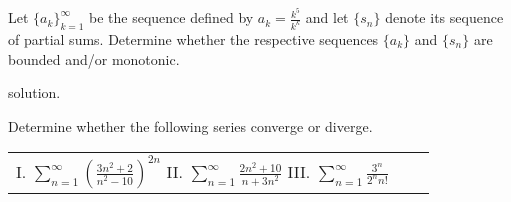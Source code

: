 \documentclass[handout]{ximera}
\begin{document}
\begin{problem}
Let $\{a_k\}_{k=1}^\infty$ be the sequence defined by $a_k = \frac{k^5}{k^k}$ and let $\{s_n\}$ denote its sequence of partial sums. Determine whether the respective sequences $\{a_k\}$ and $\{s_n\}$ are bounded and/or monotonic.
\end{problem}

\begin{freeResponse}
solution.
\end{freeResponse}

\begin{problem}
Determine whether the following series converge or diverge. 
\begin{center}
\begin{tabular}{lll}
I. $\sum_{n=1}^\infty \left(\frac{3n^2+2}{n^2-10}\right)^{2n}$ \hspace{.3in} II. $\sum_{n=1}^\infty \frac{2n^2+10}{n+3n^2}$ \hspace{.3in} III. $\sum_{n=1}^\infty \frac{3^n}{2^n n!}$
\end{tabular}
\end{center}
\end{problem}
\end{document}
